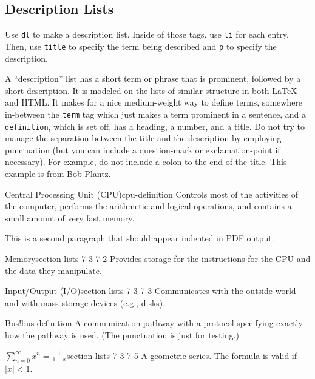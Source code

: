 \documentclass{amsart}
\theoremstyle{plain}%
\theoremstyle{definition}%
\theoremstyle{remark}%
\newcommand{\mono}[1]{\texttt{#1}}
\numberwithin{equation}{section}
\begin{document}
%
%
%
\typeout{************************************************}
\typeout{************************************************}
%
\subsection{Description Lists}\label{section-lists-7}%
Use \mono{dl} to make a description list. Inside of those tags, use \mono{li} for each entry. Then, use \mono{title} to specify the term being described and \mono{p} to specify the description.%
\par
A ``description'' list  has a short term or phrase that is prominent, followed by a short description.  It is modeled on the lists of similar structure in both \LaTeX{} and HTML.  It makes for a nice medium-weight way to define terms, somewhere in-between the \mono{term} tag which just makes a term prominent in a sentence, and a \mono{definition}, which is set off, has a heading, a number, and a title.  Do not try to manage the separation between the title and the description by employing punctuation (but you can include a question-mark or exclamation-point if necessary).  For example, do not include a colon to the end of the title.  This example is from Bob Plantz.%
\begin{descriptionlist}
\begin{dlimedium}{Central Processing Unit (CPU)}{cpu-definition}%
Controls most of the activities of the computer, performs the arithmetic and logical operations, and contains a small amount of very fast memory.%
\par
This is a second paragraph that should appear indented in PDF output.%
\end{dlimedium}%
\begin{dlimedium}{Memory}{section-lists-7-3-7-2}%
Provides storage for the instructions for the CPU and the data they manipulate.%
\end{dlimedium}%
\begin{dlimedium}{Input\slash{}Output (I\slash{}O)}{section-lists-7-3-7-3}%
Communicates with the outside world and with mass storage devices (e.g.\@, disks).%
\end{dlimedium}%
\begin{dlimedium}{Bus!}{bus-definition}%
A communication pathway with a protocol specifying exactly how the pathway is used. (The punctuation is just for testing.)%
\end{dlimedium}%
\begin{dlimedium}{\(\displaystyle \sum_{n=0}^\infty x^n = \frac{1}{1-x}\)}{section-lists-7-3-7-5}%
A geometric series.  The formula is valid if \(|x| < 1\).%
\end{dlimedium}%
\end{descriptionlist}
\end{document}
